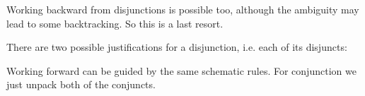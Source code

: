 
Working backward from disjunctions is possible too, although the ambiguity
may lead to some backtracking. So this is a last resort.

\begin{fitchrule} There are two possible justifications
  for a disjunction, i.e. each of its disjuncts:\\
  \label{def:proving-disjunctionss}
  \leavevmode
\end{fitchrule}

Working forward can be guided by the same schematic rules. For conjunction we
just unpack both of the conjuncts.

